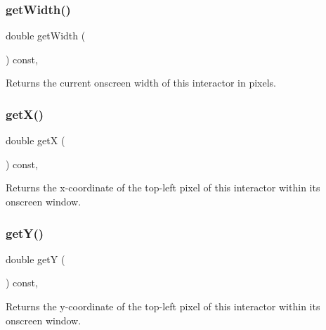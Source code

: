 \subsubsection{\texorpdfstring{get\+Width()}{getWidth()}}
{\footnotesize\ttfamily double get\+Width (\begin{DoxyParamCaption}{ }\end{DoxyParamCaption}) const\hspace{0.3cm}{\ttfamily [virtual]}, {\ttfamily [inherited]}}



Returns the current onscreen width of this interactor in pixels. 

\mbox{\label{classGInteractor_a344385751bee0720059403940d57a13e}} 
\subsubsection{\texorpdfstring{get\+X()}{getX()}}
{\footnotesize\ttfamily double getX (\begin{DoxyParamCaption}{ }\end{DoxyParamCaption}) const\hspace{0.3cm}{\ttfamily [virtual]}, {\ttfamily [inherited]}}



Returns the x-\/coordinate of the top-\/left pixel of this interactor within its onscreen window. 

\mbox{\label{classGInteractor_aafa51c7f8f38a09febbb9ce7853f77b4}} 
\subsubsection{\texorpdfstring{get\+Y()}{getY()}}
{\footnotesize\ttfamily double getY (\begin{DoxyParamCaption}{ }\end{DoxyParamCaption}) const\hspace{0.3cm}{\ttfamily [virtual]}, {\ttfamily [inherited]}}



Returns the y-\/coordinate of the top-\/left pixel of this interactor within its onscreen window. 

\mbox{\label{classGObservable_a9f6faaa25942923bafa1c44020c49fa9}} 
